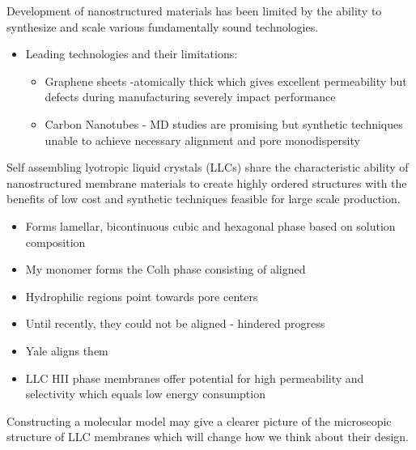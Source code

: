 \documentclass{article}
\begin{document}
	Development of nanostructured materials has been limited by the ability to synthesize and scale various fundamentally sound technologies.
	\begin{itemize}
		\item Leading technologies and their limitations:
		\begin{itemize}
			\item Graphene sheets -atomically thick which gives excellent permeability but defects during manufacturing severely impact performance
			\item Carbon Nanotubes - MD studies are promising but synthetic techniques unable to achieve necessary alignment and pore monodispersity
		\end{itemize}
	\end{itemize} 
	Self assembling lyotropic liquid crystals (LLCs) share the characteristic ability of nanostructured membrane materials to create highly ordered structures with the benefits of low cost and synthetic techniques feasible for large scale production.
	\begin{itemize}
		\item Forms lamellar, bicontinuous cubic and hexagonal phase based on solution composition
		\item My monomer forms the Colh phase consisting of aligned 
		\item Hydrophilic regions point towards pore centers
		\item Until recently, they could not be aligned - hindered progress
		\item Yale aligns them
		\item LLC HII phase membranes offer potential for high permeability and selectivity which equals low energy consumption
	\end{itemize}
	Constructing a molecular model may give a clearer picture of the microscopic structure of LLC membranes which will change how we think about their design.
\end{document}
